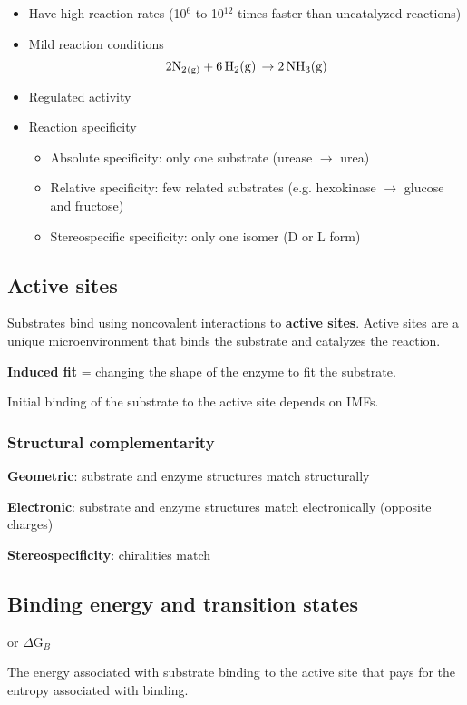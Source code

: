 \documentclass[letterpaper, 12pt]{article}
\begin{document}
\begin{itemize}
\item Have high reaction rates (10$^6$ to 10$^{12}$ times faster than uncatalyzed reactions)
\item Mild reaction conditions $$2\ce{N2_{(g)} + 6\ce{H2(g)} \to \ce{2NH3(g)}}$$
\item Regulated activity
\item Reaction specificity
\begin{itemize}
\item Absolute specificity: only one substrate (urease $\to$ urea)
\item Relative specificity: few related substrates (e.g. hexokinase $\to$ glucose and fructose)
\item Stereospecific specificity: only one isomer (D or L form)
\end{itemize}
\end{itemize}

\subsection*{Active sites}
Substrates bind using noncovalent interactions to \textbf{active sites}. Active sites are a unique microenvironment that binds the substrate and catalyzes the reaction.

\textbf{Induced fit} = changing the shape of the enzyme to fit the substrate.

Initial binding of the substrate to the active site depends on IMFs.

\subsubsection*{Structural complementarity}

\textbf{Geometric}: substrate and enzyme structures match structurally

\textbf{Electronic}: substrate and enzyme structures match electronically (opposite charges)

\textbf{Stereospecificity}: chiralities match

\subsection*{Binding energy and transition states}

or $\Delta$G$_B$

The energy associated with substrate binding to the active site that pays for the entropy associated with binding.
\end{document}
